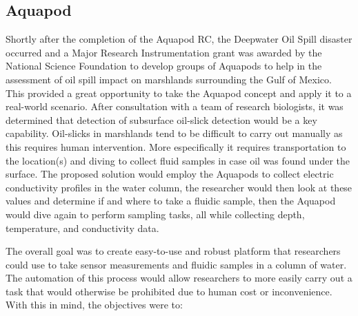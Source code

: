 \subsection{Aquapod}




Shortly after the completion of the Aquapod RC, the Deepwater Oil Spill disaster occurred and a Major Research Instrumentation grant was awarded by the National Science Foundation to develop groups of Aquapods to help in the assessment of oil spill impact on marshlands surrounding the Gulf of Mexico.  This provided a great opportunity to take the Aquapod concept and apply it to a real-world scenario. After consultation with a team of research biologists, it was determined that detection of subsurface oil-slick detection would be a key capability. Oil-slicks in marshlands tend to be difficult to carry out manually as this requires human intervention. More especifically it requires transportation to the location(s) and diving to collect fluid samples in case oil was found under the surface. The proposed solution would employ the Aquapods to collect electric conductivity profiles in the water column, the researcher would then look at these values and determine if and where to take a fluidic sample, then the Aquapod would dive again to perform sampling tasks, all while collecting depth, temperature, and conductivity data.  

The overall goal was to create easy-to-use and robust platform that researchers could use to take sensor measurements and fluidic samples in a column of water. The automation of this process would allow researchers to more easily carry out a task that would otherwise be prohibited due to human cost or inconvenience. With this in mind, the objectives were to: 

